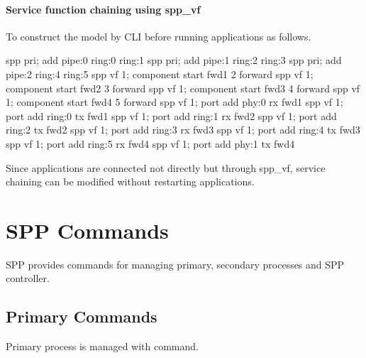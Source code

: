\documentclass[a4paper,11pt,openany,oneside,english]{sphinxmanual}
\begin{document}
\subsubsection{Service function chaining using spp\_vf}
\label{\detokenize{usecases/pipe_pmd:service-function-chaining-using-spp-vf}}
\begin{figure}[htbp]
\centering

\noindent{}
\end{figure}

To construct the model by CLI before running applications as follows.

\begin{sphinxVerbatim}[commandchars=\\\{\},formatcom=\footnotesize]
spp \PYGZgt{} pri; add pipe:0 ring:0 ring:1
spp \PYGZgt{} pri; add pipe:1 ring:2 ring:3
spp \PYGZgt{} pri; add pipe:2 ring:4 ring:5
spp \PYGZgt{} vf 1; component start fwd1 2 forward
spp \PYGZgt{} vf 1; component start fwd2 3 forward
spp \PYGZgt{} vf 1; component start fwd3 4 forward
spp \PYGZgt{} vf 1; component start fwd4 5 forward
spp \PYGZgt{} vf 1; port add phy:0 rx fwd1
spp \PYGZgt{} vf 1; port add ring:0 tx fwd1
spp \PYGZgt{} vf 1; port add ring:1 rx fwd2
spp \PYGZgt{} vf 1; port add ring:2 tx fwd2
spp \PYGZgt{} vf 1; port add ring:3 rx fwd3
spp \PYGZgt{} vf 1; port add ring:4 tx fwd3
spp \PYGZgt{} vf 1; port add ring:5 rx fwd4
spp \PYGZgt{} vf 1; port add phy:1 tx fwd4
\end{sphinxVerbatim}

Since applications are connected not directly but through spp\_vf,
service chaining can be modified without restarting applications.


\chapter{SPP Commands}
\label{\detokenize{commands/index:spp-commands}}\label{\detokenize{commands/index:spp-commands-index}}\label{\detokenize{commands/index::doc}}
SPP provides commands for managing primary, secondary processes and SPP
controller.


\section{Primary Commands}
\label{\detokenize{commands/primary:primary-commands}}\label{\detokenize{commands/primary:commands-primary}}\label{\detokenize{commands/primary::doc}}
Primary process is managed with  command.
\end{document}
